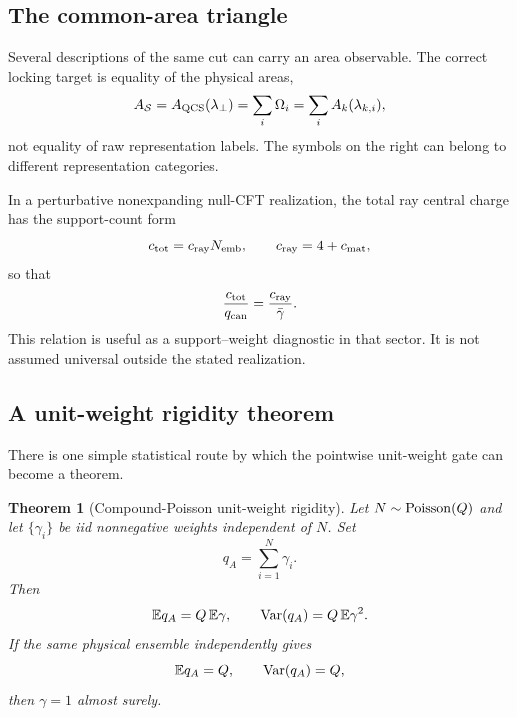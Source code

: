 \documentclass[aps,prd,preprint,nofootinbib,superscriptaddress]{revtex4-2}
\newtheorem{theorem}{Theorem}[section]
\theoremstyle{definition}
\theoremstyle{remark}
\begin{document}
\subsection{The common-area triangle}

Several descriptions of the same cut can carry an area observable.  The correct locking target is equality of the physical areas,
\begin{equation}
A_{\mathcal S}
=
A_{\rm QCS}(\lambda_\perp)
=
\sum_i\Omega_i
=
\sum_i A_k(\lambda_{k,i}),
\label{eq:commonarea}
\end{equation}
not equality of raw representation labels.  The symbols on the right can belong to different representation categories.

In a perturbative nonexpanding null-CFT realization, the total ray central charge has the support-count form
\begin{equation}
c_{\rm tot}=c_{\rm ray}N_{\rm emb},
\qquad
c_{\rm ray}=4+c_{\rm mat},
\label{eq:ctot}
\end{equation}
so that
\begin{equation}
\frac{c_{\rm tot}}{q_{\rm can}}
=
\frac{c_{\rm ray}}{\bar\gamma}.
\label{eq:centralweight}
\end{equation}
This relation is useful as a support--weight diagnostic in that sector.  It is not assumed universal outside the stated realization.

\subsection{A unit-weight rigidity theorem}

There is one simple statistical route by which the pointwise unit-weight gate can become a theorem.

\begin{theorem}[Compound-Poisson unit-weight rigidity]
\label{thm:unitweight}
Let $N\sim{\rm Poisson}(Q)$ and let $\{\gamma_i\}$ be iid nonnegative weights independent of $N$.  Set
\begin{equation}
q_A=\sum_{i=1}^N\gamma_i.
\end{equation}
Then
\begin{equation}
\mathbb E q_A=Q\,\mathbb E\gamma,
\qquad
{\rm Var}(q_A)=Q\,\mathbb E\gamma^2.
\label{eq:cp-moments}
\end{equation}
If the same physical ensemble independently gives
\begin{equation}
\mathbb E q_A=Q,
\qquad
{\rm Var}(q_A)=Q,
\label{eq:unitmoments}
\end{equation}
then $\gamma=1$ almost surely.
\end{theorem}
\end{document}
